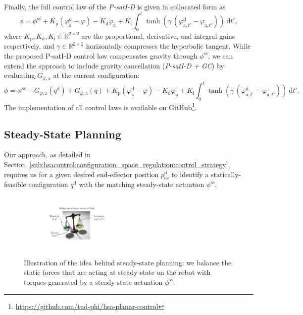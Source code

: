 % 
Finally, the full control law of the \emph{P-satI-D} is given in collocated form as
\begin{equation}\label{eq:hsacontrol:gravity_compensation_controller}
    \phi = \phi^\mathrm{ss} + K_\mathrm{p} (\varphi_\mathrm{a}^\mathrm{d} - \varphi) - K_\mathrm{d} \dot{\varphi}_\mathrm{a} + K_\mathrm{i} \int_0^t \tanh(\gamma \, ( \varphi_{\mathrm{a},t'}^\mathrm{d}-\varphi_{\mathrm{a},t'})) \: \mathrm{d} t',
\end{equation}
where $K_\mathrm{p}, K_\mathrm{d}, K_\mathrm{i} \in \mathbb{R}^{2 \times 2}$ are the proportional, derivative, and integral gains respectively, and $\gamma \in \mathbb{R}^{2 \times 2}$ horizontally compresses the hyperbolic tangent. While the proposed P-satI-D control law compensates gravity through $\phi^\mathrm{ss}$, we can extend the approach to include gravity cancellation (\emph{P-satI-D + GC}) by evaluating $G_{\varphi,\mathrm{a}}$ at the current configuration:
\begin{equation}\label{eq:hsacontrol:gravity_cancellation_controller}
    \phi = \phi^\mathrm{ss} - G_{\varphi,\mathrm{a}}(q^\mathrm{d}) + G_{\varphi,\mathrm{a}}(q) + K_\mathrm{p} (\varphi_\mathrm{a}^\mathrm{d} - \varphi) - K_\mathrm{d} \dot{\varphi}_\mathrm{a} + K_\mathrm{i} \int_0^t \tanh(\gamma \, ( \varphi_{\mathrm{a},t'}^\mathrm{d}-\varphi_{\mathrm{a},t'})) \: \mathrm{d} t'.
\end{equation}
The implementation of all control laws is available on GitHub\footnote{\url{https://github.com/tud-phi/hsa-planar-control}}.

\subsection{Steady-State Planning}\label{sub:hsacontrol:experiments:steady_state_planning}
Our approach, as detailed in Section~\ref{sub:hsacontrol:configuration_space_regulation:control_strategy}, requires us for a given desired end-effector position $p_\mathrm{ee}^\mathrm{d}$ to identify a statically-feasible configuration $q^\mathrm{d}$ with the matching steady-state actuation $\phi^\mathrm{ss}$.

\begin{figure}[hbt]
    \centering
\includegraphics[width=0.5\textwidth]{hsacontrol/figures/control_schemes/configuration_space_regulation/steady_state_planning_cropped.pdf}
    \caption{Illustration of the idea behind steady-state planning: we balance the static forces that are acting at steady-state on the robot with torques generated by a steady-state actuation $\phi^\mathrm{ss}$.}
    \label{fig:hsacontrol:configuration_space_regulation:steady_state_planning}
\end{figure}

